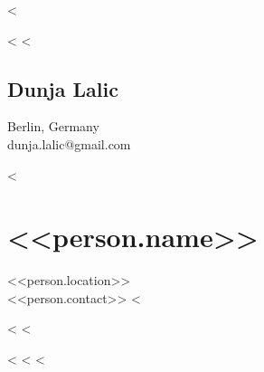 <%



<%
  <%
    \begin{paracol}{2}
    \begin{leftcolumn}
    \noindent
    \end{leftcolumn}

    \begin{rightcolumn}
    \section{Dunja Lalic}
    Berlin, Germany\\
    dunja.lalic@gmail.com
    \end{rightcolumn}
    \end{paracol}
  <%
    \section{<<person.name>>}
    <<person.location>>\\
    <<person.contact>>
<%


\begin{paracol}{2}
\begin{leftcolumn}
<%
<%
\end{leftcolumn}

\begin{rightcolumn}
<%
<%
<%
\end{rightcolumn}
\end{paracol}

